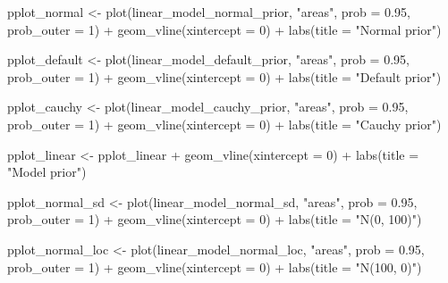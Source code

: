 \documentclass[
  letterpaper,
  DIV=11,
  numbers=noendperiod]{scrartcl}
\newenvironment{Shaded}{\begin{snugshade}}{\end{snugshade}}
\newcommand{\AttributeTok}[1]{\textcolor[rgb]{0.40,0.45,0.13}{#1}}
\newcommand{\DecValTok}[1]{\textcolor[rgb]{0.68,0.00,0.00}{#1}}
\newcommand{\FloatTok}[1]{\textcolor[rgb]{0.68,0.00,0.00}{#1}}
\newcommand{\FunctionTok}[1]{\textcolor[rgb]{0.28,0.35,0.67}{#1}}
\newcommand{\NormalTok}[1]{\textcolor[rgb]{0.00,0.23,0.31}{#1}}
\newcommand{\OtherTok}[1]{\textcolor[rgb]{0.00,0.23,0.31}{#1}}
\newcommand{\SpecialCharTok}[1]{\textcolor[rgb]{0.37,0.37,0.37}{#1}}
\newcommand{\StringTok}[1]{\textcolor[rgb]{0.13,0.47,0.30}{#1}}
\begin{document}
\begin{Shaded}
\begin{Highlighting}[]
\NormalTok{pplot\_normal }\OtherTok{\textless{}{-}} \FunctionTok{plot}\NormalTok{(linear\_model\_normal\_prior, }\StringTok{"areas"}\NormalTok{, }\AttributeTok{prob =} \FloatTok{0.95}\NormalTok{, }\AttributeTok{prob\_outer =} \DecValTok{1}\NormalTok{) }\SpecialCharTok{+}
  \FunctionTok{geom\_vline}\NormalTok{(}\AttributeTok{xintercept =} \DecValTok{0}\NormalTok{) }\SpecialCharTok{+} \FunctionTok{labs}\NormalTok{(}\AttributeTok{title =} \StringTok{"Normal prior"}\NormalTok{)}

\NormalTok{pplot\_default }\OtherTok{\textless{}{-}} \FunctionTok{plot}\NormalTok{(linear\_model\_default\_prior, }\StringTok{"areas"}\NormalTok{, }\AttributeTok{prob =} \FloatTok{0.95}\NormalTok{, }\AttributeTok{prob\_outer =} \DecValTok{1}\NormalTok{) }\SpecialCharTok{+}
  \FunctionTok{geom\_vline}\NormalTok{(}\AttributeTok{xintercept =} \DecValTok{0}\NormalTok{) }\SpecialCharTok{+} \FunctionTok{labs}\NormalTok{(}\AttributeTok{title =} \StringTok{"Default prior"}\NormalTok{)}

\NormalTok{pplot\_cauchy }\OtherTok{\textless{}{-}} \FunctionTok{plot}\NormalTok{(linear\_model\_cauchy\_prior, }\StringTok{"areas"}\NormalTok{, }\AttributeTok{prob =} \FloatTok{0.95}\NormalTok{, }\AttributeTok{prob\_outer =} \DecValTok{1}\NormalTok{) }\SpecialCharTok{+}
  \FunctionTok{geom\_vline}\NormalTok{(}\AttributeTok{xintercept =} \DecValTok{0}\NormalTok{) }\SpecialCharTok{+} \FunctionTok{labs}\NormalTok{(}\AttributeTok{title =} \StringTok{"Cauchy prior"}\NormalTok{)}

\NormalTok{pplot\_linear }\OtherTok{\textless{}{-}}\NormalTok{ pplot\_linear }\SpecialCharTok{+} \FunctionTok{geom\_vline}\NormalTok{(}\AttributeTok{xintercept =} \DecValTok{0}\NormalTok{) }\SpecialCharTok{+} \FunctionTok{labs}\NormalTok{(}\AttributeTok{title =} \StringTok{"Model prior"}\NormalTok{)}

\NormalTok{pplot\_normal\_sd }\OtherTok{\textless{}{-}} \FunctionTok{plot}\NormalTok{(linear\_model\_normal\_sd, }\StringTok{"areas"}\NormalTok{, }\AttributeTok{prob =} \FloatTok{0.95}\NormalTok{, }\AttributeTok{prob\_outer =} \DecValTok{1}\NormalTok{) }\SpecialCharTok{+} 
  \FunctionTok{geom\_vline}\NormalTok{(}\AttributeTok{xintercept =} \DecValTok{0}\NormalTok{) }\SpecialCharTok{+} \FunctionTok{labs}\NormalTok{(}\AttributeTok{title =} \StringTok{"N(0, 100)"}\NormalTok{)}

\NormalTok{pplot\_normal\_loc }\OtherTok{\textless{}{-}} \FunctionTok{plot}\NormalTok{(linear\_model\_normal\_loc, }\StringTok{"areas"}\NormalTok{, }\AttributeTok{prob =} \FloatTok{0.95}\NormalTok{, }\AttributeTok{prob\_outer =} \DecValTok{1}\NormalTok{) }\SpecialCharTok{+} 
  \FunctionTok{geom\_vline}\NormalTok{(}\AttributeTok{xintercept =} \DecValTok{0}\NormalTok{) }\SpecialCharTok{+} \FunctionTok{labs}\NormalTok{(}\AttributeTok{title =} \StringTok{"N(100, 0)"}\NormalTok{)}


\end{Highlighting}
\end{Shaded}
\end{document}
